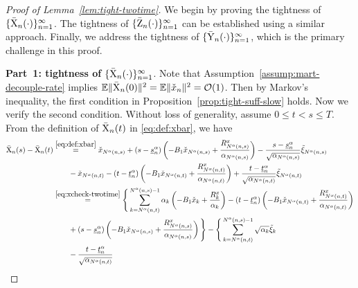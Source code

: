 \documentclass[11pt]{article}
\theoremstyle{plain}
\theoremstyle{definition}
\def\OM{{\mathcal O}}
\def\EB{{\mathbb E}}
\newcommand{\xcheck}{{\check{x}}}
\newcommand{\xbar}{{\bar{\textnormal{X}}}}
\newcommand{\ybar}{{\bar{\textnormal{Y}}}}
\newcommand{\zbar}{{\bar{\textnormal{Z}}}}
\newcommand{\ssum}[3]{\sum\limits_{{#1}={#2}}^{#3}}
\begin{document}
\begin{appendix}
\begin{proof}[Proof of Lemma~\ref{lem:tight-twotime}]
We begin by proving the tightness of $\{ \xbar_{n}(\cdot) \}_{n=1}^\infty$. The tightness of $\{ \zbar_{n}(\cdot) \}_{n=1}^\infty$ can be established using a similar approach. Finally, we address the tightness of $\{ \ybar_{n}(\cdot) \}_{n=1}^\infty$, which is the primary challenge in this proof.
\vspace{0.2cm}

\textbf{Part~1: tightness of $\{ \xbar_{n}(\cdot) \}_{n=1}^\infty$}.
Note that Assumption~\ref{assump:mart-decouple-rate} implies $\EB \| \xbar_{n}(0) \|^2 = \EB \| \xcheck_{n} \|^2 = \OM(1)$. 
Then by Markov's inequality, the first condition in Proposition~\ref{prop:tight-suff-slow} holds.
Now we verify the second condition.
Without loss of generality,  assume $0 \le t < s \le T$.
From the definition of $\xbar_{n}(t)$ in \eqref{eq:def:xbar}, we have
\begin{align*}
    \xbar_{n}(s) - \xbar_{n}(t)
    & \overset{\eqref{eq:def:xbar}}{=} \xcheck_{N^\alpha(n,s)} + (s - \underline{s}^\alpha_{n} ) \left( - B_1 \xcheck_{N^\alpha(n,s)} + \frac{ R_{N^\alpha(n,s)}^x }{ \alpha_{N^\alpha(n,s)} } \right) - \frac{s - \underline{s}^\alpha_{n}}{ \sqrt{ \alpha_{N^\alpha(n,s)} } } 
    \tilde{\xi}_{N^\alpha(n,s)} \\
    & \qquad - \xcheck_{N^\alpha(n,t)} - (t - \underline{t}^\alpha_{n} ) \left( - B_1 \xcheck_{N^\alpha(n,t)} + \frac{ R_{N^\alpha(n,t)}^x }{ \alpha_{N^\alpha(n,t)} } \right) + \frac{t - \underline{t}^\alpha_{n}}{ \sqrt{\alpha_{N^\alpha(n,t)} } } 
    \tilde{\xi}_{N^\alpha(n,t)} \\
    & \overset{\eqref{eq:xcheck-twotime}}{=} \Bigg\{ \ssum{k}{N^\alpha(n,t)}{N^\alpha(n,s)-1} \alpha_{k} \left( - B_1 \xcheck_{k} + \frac{R_{k}^x}{\alpha_{k}} \right) - (t - \underline{t}^\alpha_{n} ) \left( - B_1 \xcheck_{N^\alpha(n,t)} + \frac{ R_{N^\alpha(n,t)}^x }{ \alpha_{N^\alpha(n,t)} } \right) \\
    & \qquad + (s - \underline{s}^\alpha_{n} ) \left( - B_1 \xcheck_{N^\alpha(n,s)} + \frac{ R_{N^\alpha(n,s)}^x }{ \alpha_{N^\alpha(n,s)} } \right) \Bigg\} - \Bigg\{ \ssum{k}{N^\alpha(n,t)}{N^\alpha(n,s)-1} \sqrt{\alpha_{k}} \tilde{\xi}_{k} \\ 
    & \qquad -  \frac{t - \underline{t}^\alpha_{n}}{ \sqrt{\alpha_{N^\alpha(n,t)} } } 

\end{align*}
\end{proof}
\end{appendix}
\end{document}
